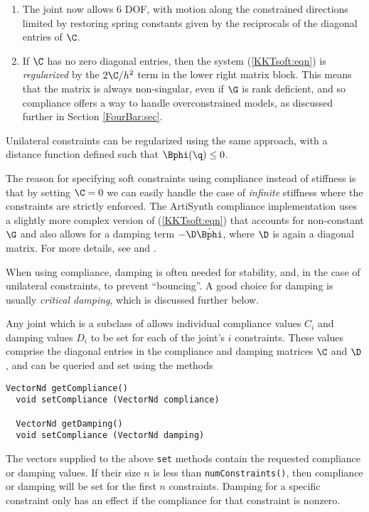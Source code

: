 \begin{enumerate}

\item The joint now allows 6 DOF, with motion along the constrained directions
limited by restoring spring constants given by the reciprocals of the
diagonal entries of $\C$.

\item If $\C$ has no zero diagonal entries, then the system
(\ref{KKTsoft:eqn}) is {\it regularized} by the $2 \C/h^2$ term in the
lower right matrix block. This means that the matrix is always
non-singular, even if $\G$ is rank deficient, and so compliance offers
a way to handle overconstrained models, as discussed further in
Section \ref{FourBar:sec}.

\end{enumerate}

Unilateral constraints can be regularized using the same approach,
with a distance function defined such that $\Bphi(\q) \le 0$.  

The reason for specifying soft constraints using compliance instead of
stiffness is that by setting $\C = 0$ we can easily handle the case of
{\it infinite} stiffness where the constraints are strictly enforced.
The ArtiSynth compliance implementation uses a slightly more complex
version of (\ref{KKTsoft:eqn}) that accounts for non-constant $\G$ and
also allows for a damping term $-\D \dot\Bphi$, where $\D$ is again a
diagonal matrix.  For more details, see \cite{lacoursiere2007ghosts}
and \cite{servin2006interactive}.

When using compliance, damping is often needed for stability, and, in
the case of unilateral constraints, to prevent ``bouncing''.  A good
choice for damping is usually {\it critical damping}, which is
discussed further below.

Any joint which is a subclass of
 allows
individual compliance values $C_i$ and damping values $D_i$ to be set
for each of the joint's $i$ constraints. These values comprise the
diagonal entries in the compliance and damping matrices $\C$ and $\D$,
and can be queried and set using the methods
\begin{lstlisting}[]
  VectorNd getCompliance()
  void setCompliance (VectorNd compliance)

  VectorNd getDamping()
  void setCompliance (VectorNd damping)
\end{lstlisting}
%
The vectors supplied to the above {\tt set} methods contain the
requested compliance or damping values. If their size $n$ is less than
{\tt numConstraints()}, then compliance or damping will be set for the
first $n$ constraints.  Damping for a specific constraint only has an
effect if the compliance for that constraint is nonzero.

